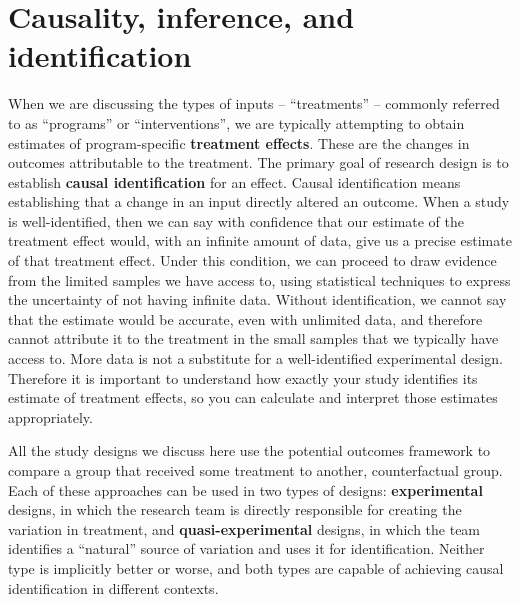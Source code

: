 
\section{Causality, inference, and identification}

When we are discussing the types of inputs -- ``treatments'' -- commonly referred to as
``programs'' or ``interventions'', we are typically attempting to obtain estimates
of program-specific \textbf{treatment effects}.
These are the changes in outcomes attributable to the treatment.\cite{abadie2018econometric}
The primary goal of research design is to establish \textbf{causal identification} for an effect.
Causal identification means establishing that a change in an input directly altered an outcome.
When a study is well-identified, then we can say with confidence
that our estimate of the treatment effect would,
with an infinite amount of data,
give us a precise estimate of that treatment effect.
Under this condition, we can proceed to draw evidence from the limited samples we have access to,
using statistical techniques to express the uncertainty of not having infinite data.
Without identification, we cannot say that the estimate would be accurate,
even with unlimited data, and therefore cannot attribute it to the treatment
in the small samples that we typically have access to.
More data is not a substitute for a well-identified experimental design.
Therefore it is important to understand how exactly your study
identifies its estimate of treatment effects,
so you can calculate and interpret those estimates appropriately.

All the study designs we discuss here use the potential outcomes framework\cite{athey2017state}
to compare a group that received some treatment to another, counterfactual group.
Each of these approaches can be used in two types of designs:
\textbf{experimental} designs, in which the research team
is directly responsible for creating the variation in treatment,
and \textbf{quasi-experimental} designs, in which the team
identifies a ``natural'' source of variation and uses it for identification.
Neither type is implicitly better or worse,
and both types are capable of achieving causal identification in different contexts.

